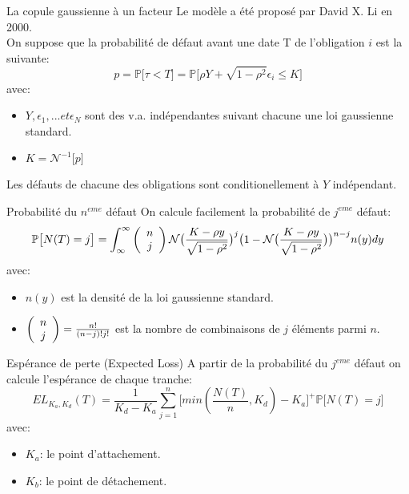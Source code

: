 \documentclass{beamer}
\begin{document}
\begin{frame}{La copule gaussienne à un facteur}
Le modèle a été proposé par David X. Li en 2000.\\
\vspace{0.5cm}
On suppose que la probabilité de défaut avant une date T de l'obligation $i$ est la suivante:\\
\[
p=\mathbb{P}\big[\tau < T\big]=\mathbb{P}\big[\rho Y + \sqrt{1-\rho^2} \epsilon_i \leq K\big]
\]
avec:
\begin{itemize}
\item $Y, \epsilon_1, ... et \epsilon_N$ sont des v.a. indépendantes suivant chacune une loi gaussienne standard.\\
\item $K = \mathcal{N}^{-1}\big[p\big]$\\
\end{itemize}
\vspace{0.5cm}
Les défauts de chacune des obligations sont conditionellement à $Y$ indépendant.
\end{frame}

\begin{frame}{Probabilité du $n^{eme}$ défaut}
On calcule facilement la probabilité de $j^{eme}$ défaut:\\
\[
\mathbb{P}\big[N(T)=j\big]=\int_{\infty}^{\infty}\left( {\begin{array}{*{20}c}
n \\
j \\
\end{array}} \right)
 \mathcal{N}\big(\frac{K-\rho y}{\sqrt{1-\rho^2}}\big)^j\big(1-\mathcal{N}\big(\frac{K-\rho y}{\sqrt{1-\rho^2}}\big)\big)^{n-j}n(y)dy
\]
avec:\\
\begin{itemize}
\item $n(y)$ est la densité de la loi gaussienne standard.
\item $\left( {\begin{array}{*{20}c}
n \\
j \\
\end{array}} \right)=\frac{n!}{(n-j)!j!}$ est la nombre de combinaisons de $j$ éléments parmi $n$.
\end{itemize}
\end{frame}

\begin{frame}{Espérance de perte (Expected Loss)}
A partir de la probabilité du $j^{eme}$ défaut on calcule l'espérance de chaque tranche:\\
\[
EL_{K_a,K_d}(T)=\frac{1}{K_d-K_a}\sum_{j=1}^{n}\big[min(\frac{N(T)}{n},K_d)-K_a\big]^+\mathbb{P}\big[N(T)=j\big]
\]
avec:\\
\begin{itemize}
\item $K_a$: le point d'attachement.
\item $K_b$: le point de détachement.
\end{itemize}
\end{frame}
\end{document}
